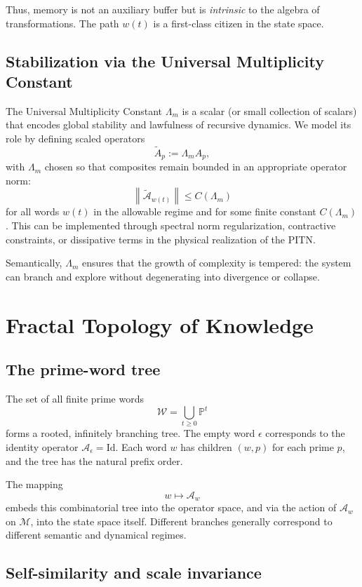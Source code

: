 \documentclass[11pt]{article}
\newcommand{\Mcal}{\mathcal{M}}
\newcommand{\Acal}{\mathcal{A}}
\newcommand{\norm}[1]{\left\lVert #1 \right\rVert}
\newcommand{\Lm}{\Lambda_m}
\begin{document}
Thus, memory is not an auxiliary buffer but is \emph{intrinsic} to the algebra of transformations.
The path \(w(t)\) is a first-class citizen in the state space.

\subsection{Stabilization via the Universal Multiplicity Constant}

The Universal Multiplicity Constant \(\Lm\) is a scalar (or small collection of scalars) that encodes global stability and lawfulness of recursive dynamics.
We model its role by defining scaled operators
\[
\widetilde{A}_p := \Lm A_p,
\]
with \(\Lm\) chosen so that composites remain bounded in an appropriate operator norm:
\[
\norm{\widetilde{\Acal}_{w(t)}} \leq C(\Lm)
\]
for all words \(w(t)\) in the allowable regime and for some finite constant \(C(\Lm)\).
This can be implemented through spectral norm regularization, contractive constraints, or dissipative terms in the physical realization of the PITN.

Semantically, \(\Lm\) ensures that the growth of complexity is tempered: the system can branch and explore without degenerating into divergence or collapse.

\section{Fractal Topology of Knowledge}

\subsection{The prime-word tree}

The set of all finite prime words
\[
\mathscr{W} = \bigcup_{t \geq 0} \mathbb{P}^t
\]
forms a rooted, infinitely branching tree.
The empty word \(\epsilon\) corresponds to the identity operator \(\Acal_{\epsilon} = \mathrm{Id}\).
Each word \(w\) has children \((w,p)\) for each prime \(p\), and the tree has the natural prefix order.

The mapping
\[
w \mapsto \Acal_{w}
\]
embeds this combinatorial tree into the operator space, and via the action of \(\Acal_w\) on \(\Mcal\), into the state space itself.
Different branches generally correspond to different semantic and dynamical regimes.

\subsection{Self-similarity and scale invariance}
\end{document}
